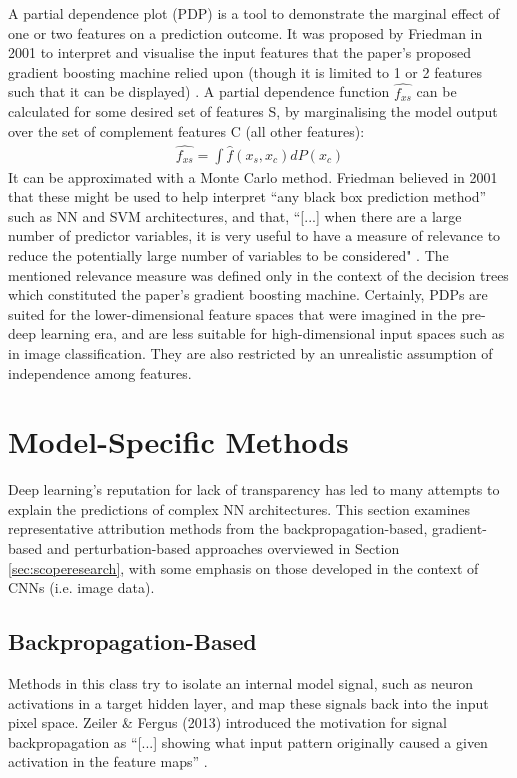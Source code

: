 \documentclass[main]{subfiles}
\begin{document}
A partial dependence plot (PDP) is a tool to demonstrate the marginal effect of one or two features on a prediction outcome. It was proposed by Friedman in 2001 to interpret and visualise the input features that the paper's proposed gradient boosting machine relied upon (though it is limited to 1 or 2 features such that it can be displayed) \cite{pdp1}. A partial dependence function $\widehat{f_{xs}}$ can be calculated for some desired set of features S, by marginalising the model output over the set of complement features C (all other features):
\begin{align}
\widehat{f_{xs}}=\int \widehat{f}(x_{s}, x_{c})dP(x_{c})
\end{align}
It can be approximated with a Monte Carlo method. Friedman believed in 2001 that these might be used to help interpret ``any black box prediction method'' such as NN and SVM architectures, and that, ``[...] when there are a large number of predictor variables, it is very useful to have a measure of relevance to reduce the potentially large number of variables to be considered" \cite{pdp1}. The mentioned relevance measure was defined only in the context of the decision trees which constituted the paper's gradient boosting machine. Certainly, PDPs are suited for the lower-dimensional feature spaces that were imagined in the pre-deep learning era, and are less suitable for high-dimensional input spaces such as in image classification. They are also restricted by an unrealistic assumption of independence among features.

\section{Model-Specific Methods} \label{sec:modelspec}
Deep learning's reputation for lack of transparency has led to many attempts to explain the predictions of complex NN architectures. This section examines representative attribution methods from the backpropagation-based, gradient-based and perturbation-based approaches overviewed in Section \ref{sec:scoperesearch}, with some emphasis on those developed in the context of CNNs (i.e. image data).


\subsection{Backpropagation-Based} \label{sec:backprop}

Methods in this class try to isolate an internal model signal, such as neuron activations in a target hidden layer, and map these signals back into the input pixel space. Zeiler \& Fergus (2013) introduced the motivation for signal backpropagation as ``[...] showing what input pattern originally caused a given activation in the feature maps'' \cite{zeilerfergus2013}. 
\end{document}

